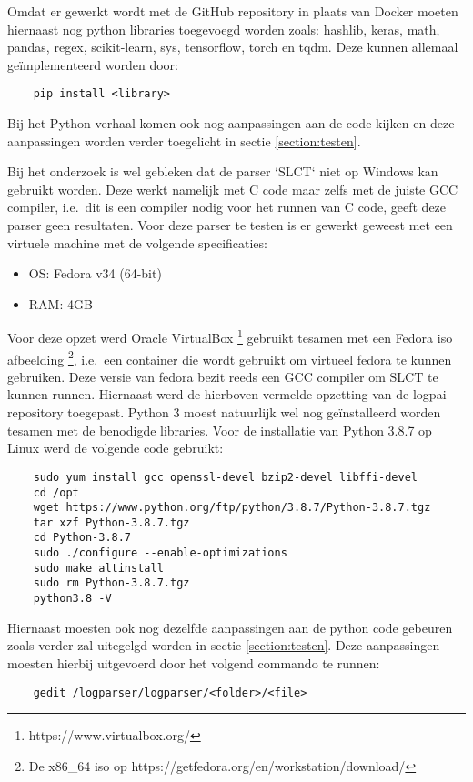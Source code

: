 Omdat er gewerkt wordt met de GitHub repository in plaats van Docker moeten hiernaast nog python libraries toegevoegd worden zoals: hashlib, keras, math, pandas, regex, scikit-learn, sys, tensorflow, torch en tqdm. Deze kunnen allemaal geïmplementeerd worden door:
\begin{verbatim}
    pip install <library>
\end{verbatim}
Bij het Python verhaal komen ook nog aanpassingen aan de code kijken en deze aanpassingen worden verder toegelicht in sectie \ref{section:testen}.

Bij het onderzoek is wel gebleken dat de parser `SLCT` niet op Windows kan gebruikt worden. Deze werkt namelijk met C code maar zelfs met de juiste GCC compiler, i.e.\ dit is een compiler nodig voor het runnen van C code, geeft deze parser geen resultaten. Voor deze parser te testen is er gewerkt geweest met een virtuele machine met de volgende specificaties:
\begin{itemize}
    \item OS: Fedora v34 (64-bit)
    \item RAM: 4GB
\end{itemize}

Voor deze opzet werd Oracle VirtualBox \footnote{https://www.virtualbox.org/} gebruikt tesamen met een Fedora iso afbeelding \footnote{De x86\_64 iso op https://getfedora.org/en/workstation/download/}, i.e.\ een container die wordt gebruikt om virtueel fedora te kunnen gebruiken. Deze versie van fedora bezit reeds een GCC compiler om SLCT te kunnen runnen. Hiernaast werd de hierboven vermelde opzetting van de logpai repository toegepast. Python 3 moest natuurlijk wel nog geïnstalleerd worden tesamen met de benodigde libraries. Voor de installatie van Python 3.8.7 op Linux werd de volgende code gebruikt:
\begin{verbatim}
    sudo yum install gcc openssl-devel bzip2-devel libffi-devel
    cd /opt
    wget https://www.python.org/ftp/python/3.8.7/Python-3.8.7.tgz
    tar xzf Python-3.8.7.tgz
    cd Python-3.8.7
    sudo ./configure --enable-optimizations
    sudo make altinstall
    sudo rm Python-3.8.7.tgz
    python3.8 -V
\end{verbatim}

Hiernaast moesten ook nog dezelfde aanpassingen aan de python code gebeuren zoals verder zal uitegelgd worden in sectie \ref{section:testen}. Deze aanpassingen moesten hierbij uitgevoerd door het volgend commando te runnen:
\begin{verbatim}
    gedit /logparser/logparser/<folder>/<file>
\end{verbatim}

